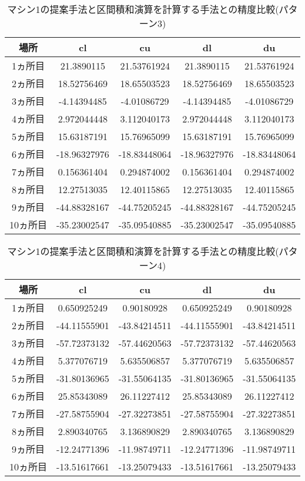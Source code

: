 \documentclass[11pt,a4paper]{jsreport}
\theoremstyle{definition}
\begin{document}
\begin{table}[H]
\centering
\begin{tabular}{|c|c|c|c|c|}
\hline
場所 & cl & cu & dl & du \\ \hline
1ヵ所目 & 21.3890115 & 21.53761924 & 21.3890115 & 21.53761924 \\ \hline
2ヵ所目 & 18.52756469 & 18.65503523 & 18.52756469 & 18.65503523 \\ \hline
3ヵ所目 & -4.14394485 & -4.01086729 & -4.14394485 & -4.01086729 \\ \hline
4ヵ所目 & 2.972044448 & 3.112040173 & 2.972044448 & 3.112040173 \\ \hline
5ヵ所目 & 15.63187191 & 15.76965099 & 15.63187191 & 15.76965099 \\ \hline
6ヵ所目 & -18.96327976 & -18.83448064 & -18.96327976 & -18.83448064 \\ \hline
7ヵ所目 & 0.156361404 & 0.294874002 & 0.156361404 & 0.294874002 \\ \hline
8ヵ所目 & 12.27513035 & 12.40115865 & 12.27513035 & 12.40115865 \\ \hline
9ヵ所目 & -44.88328167 & -44.75205245 & -44.88328167 & -44.75205245 \\ \hline
10ヵ所目 & -35.23002547 & -35.09540885 & -35.23002547 & -35.09540885 \\ \hline
\end{tabular}
\caption{マシン1の提案手法と区間積和演算を計算する手法との精度比較(パターン3)}
\end{table}

\begin{table}[H]
\centering
\begin{tabular}{|c|c|c|c|c|}
\hline
場所 & cl & cu & dl & du \\ \hline
1ヵ所目 & 0.650925249 & 0.90180928 & 0.650925249 & 0.90180928 \\ \hline
2ヵ所目 & -44.11555901 & -43.84214511 & -44.11555901 & -43.84214511 \\ \hline
3ヵ所目 & -57.72373132 & -57.44620563 & -57.72373132 & -57.44620563 \\ \hline
4ヵ所目 & 5.377076719 & 5.635506857 & 5.377076719 & 5.635506857 \\ \hline
5ヵ所目 & -31.80136965 & -31.55064135 & -31.80136965 & -31.55064135 \\ \hline
6ヵ所目 & 25.85343089 & 26.11227412 & 25.85343089 & 26.11227412 \\ \hline
7ヵ所目 & -27.58755904 & -27.32273851 & -27.58755904 & -27.32273851 \\ \hline
8ヵ所目 & 2.890340765 & 3.136890829 & 2.890340765 & 3.136890829 \\ \hline
9ヵ所目 & -12.24771396 & -11.98749711 & -12.24771396 & -11.98749711 \\ \hline
10ヵ所目 & -13.51617661 & -13.25079433 & -13.51617661 & -13.25079433 \\ \hline
\end{tabular}
\caption{マシン1の提案手法と区間積和演算を計算する手法との精度比較(パターン4)}
\end{table}
\end{document}
